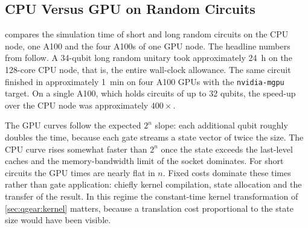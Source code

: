 \subsection{CPU Versus GPU on Random Circuits}\label{sec:qgear:results-cpu-gpu}

 compares the simulation time of short and long random circuits on the CPU node, one A100 and the four A100s of one GPU node. The headline numbers from \cite{guo2025qgear} follow. A 34-qubit long random unitary took approximately \SI{24}{\hour} on the 128-core CPU node, that is, the entire wall-clock allowance. The same circuit finished in approximately \SI{1}{\minute} on four A100 GPUs with the \texttt{nvidia-mgpu} target. On a single A100, which holds circuits of up to 32 qubits, the speed-up over the CPU node was approximately $400\times$.

The GPU curves follow the expected $2^{n}$ slope: each additional qubit roughly doubles the time, because each gate streams a state vector of twice the size. The CPU curve rises somewhat faster than $2^{n}$ once the state exceeds the last-level caches and the memory-bandwidth limit of the socket dominates. For short circuits the GPU times are nearly flat in $n$. Fixed costs dominate these times rather than gate application: chiefly kernel compilation, state allocation and the transfer of the result. In this regime the constant-time kernel transformation of \cref{sec:qgear:kernel} matters, because a translation cost proportional to the state size would have been visible.

